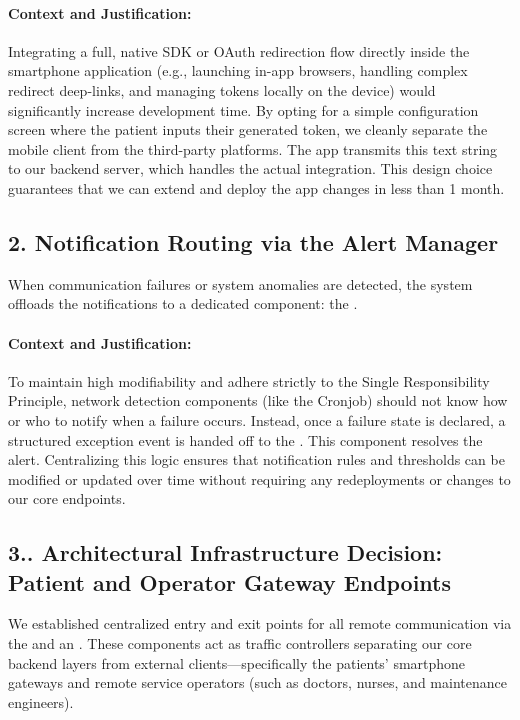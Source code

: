 \paragraph{Context and Justification:}
Integrating a full, native SDK or OAuth redirection flow directly inside the smartphone application (e.g., launching in-app browsers, handling complex redirect deep-links, and managing tokens locally on the device) would significantly increase development time. By opting for a simple configuration screen where the patient inputs their generated token, we cleanly separate the mobile client from the third-party platforms. The app transmits this text string to our backend server, which handles the actual integration. This design choice guarantees that we can extend and deploy the app changes in less than 1 month.

\subsection*{2. Notification Routing via the Alert Manager}
When communication failures or system anomalies are detected, the system offloads the notifications to a dedicated component: the .

\paragraph{Context and Justification:}
To maintain high modifiability and adhere strictly to the Single Responsibility Principle, network detection components (like the Cronjob) should not know how or who to notify when a failure occurs. Instead, once a failure state is declared, a structured exception event is handed off to the . This component resolves the alert. Centralizing this logic ensures that notification rules and thresholds can be modified or updated over time without requiring any redeployments or changes to our core endpoints.

\subsection*{3.. Architectural Infrastructure Decision: Patient and Operator Gateway Endpoints}

We established centralized entry and exit points for all remote communication via the  and an . These components act as traffic controllers separating our core backend layers from external clients—specifically the patients' smartphone gateways and remote service operators (such as doctors, nurses, and maintenance engineers).

